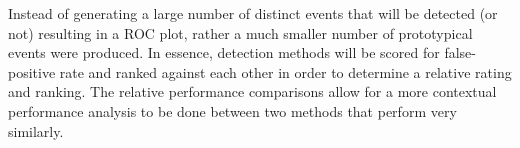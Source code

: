\documentclass{llncs}
\begin{document}
Instead of generating a large number of distinct events
that will be detected (or not) resulting in a ROC plot, rather a much smaller
number of prototypical events were produced.
In essence, detection methods
will be scored for false-positive rate and ranked against each other in order to
determine a relative rating and ranking. The relative performance comparisons
allow for a more contextual performance analysis to be done between two methods
that perform very similarly.

%
%
%
%
%
%
\end{document}
